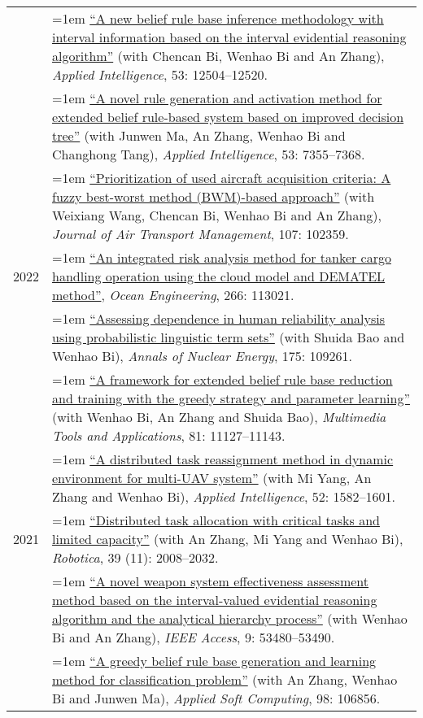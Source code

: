 \documentclass[11pt,english]{article}
\begin{document}
\begin{tabular}{p{.85in}>{\hangindent=1em}p{5.65in}<{\raggedright}}
 &  \href{https://doi.org/10.1007/s10489-022-04182-z}{``A new belief rule base inference methodology with interval information based on the interval evidential reasoning algorithm''} (with Chencan Bi, Wenhao Bi and An Zhang), \textit{Applied Intelligence}, 53: 12504--12520. \\

 &  \href{https://doi.org/10.1007/s10489-022-03803-x}{``A novel rule generation and activation method for extended belief rule-based system based on improved decision tree''} (with Junwen Ma, An Zhang, Wenhao Bi and Changhong Tang), \textit{Applied Intelligence}, 53: 7355--7368. \\

 &  \href{https://doi.org/10.1016/j.jairtraman.2023.102359}{``Prioritization of used aircraft acquisition criteria: A fuzzy best-worst method (BWM)-based approach''} (with Weixiang Wang, Chencan Bi, Wenhao Bi and An Zhang), \textit{Journal of Air Transport Management}, 107: 102359. \\
 
2022 &  \href{https://doi.org/10.1016/j.oceaneng.2022.113021}{``An integrated risk analysis method for tanker cargo handling operation using the cloud model and DEMATEL method''}, \textit{Ocean Engineering}, 266: 113021. \\
 &  \href{https://doi.org/10.1016/j.anucene.2022.109261}{``Assessing dependence in human reliability analysis using probabilistic linguistic term sets''} (with Shuida Bao and Wenhao Bi), \textit{Annals of Nuclear Energy}, 175: 109261. \\
 &  \href{https://doi.org/10.1007/s11042-022-12232-4}{``A framework for extended belief rule base reduction and training with the greedy strategy and parameter learning''} (with Wenhao Bi, An Zhang and Shuida Bao), \textit{Multimedia Tools and Applications}, 81: 11127--11143. \\
 &  \href{https://doi.org/10.1007/s10489-021-02502-3}{``A distributed task reassignment method in dynamic environment for multi-UAV system''} (with Mi Yang, An Zhang and Wenhao Bi), \textit{Applied Intelligence}, 52: 1582--1601. \\
2021 &  \href{https://doi.org/10.1017/S0263574721000102}{``Distributed task allocation with critical tasks and limited capacity''} (with An Zhang, Mi Yang and Wenhao Bi), \textit{Robotica}, 39 (11): 2008--2032. \\
 &  \href{https://doi.org/10.1109/ACCESS.2021.3071419}{``A novel weapon system effectiveness assessment method based on the interval-valued evidential reasoning algorithm and the analytical hierarchy process''} (with Wenhao Bi and An Zhang), \textit{IEEE Access}, 9: 53480--53490. \\
 &  \href{https://doi.org/10.1016/j.asoc.2020.106856}{``A greedy belief rule base generation and learning method for classification problem''} (with An Zhang, Wenhao Bi and Junwen Ma), \textit{Applied Soft Computing}, 98: 106856. \\


\end{tabular}
\end{document}
